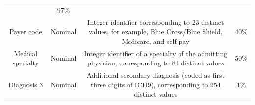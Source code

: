 \documentclass[]{article}
\begin{document}
\begin{longtable}[c]{@{}cccc@{}}
\begin{minipage}[t]{0.35\columnwidth}
\strut\end{minipage} &
\begin{minipage}[t]{0.24\columnwidth}\centering\strut
97\%
\strut\end{minipage}\tabularnewline
\begin{minipage}[t]{0.20\columnwidth}\centering\strut
Payer code
\strut\end{minipage} &
\begin{minipage}[t]{0.09\columnwidth}\centering\strut
Nominal
\strut\end{minipage} &
\begin{minipage}[t]{0.35\columnwidth}\centering\strut
Integer identifier corresponding to 23 distinct values, for example,
Blue Cross/Blue Shield, Medicare, and self-pay
\strut\end{minipage} &
\begin{minipage}[t]{0.24\columnwidth}\centering\strut
40\%
\strut\end{minipage}\tabularnewline
\begin{minipage}[t]{0.20\columnwidth}\centering\strut
Medical specialty
\strut\end{minipage} &
\begin{minipage}[t]{0.09\columnwidth}\centering\strut
Nominal
\strut\end{minipage} &
\begin{minipage}[t]{0.35\columnwidth}\centering\strut
Integer identifier of a specialty of the admitting physician,
corresponding to 84 distinct values
\strut\end{minipage} &
\begin{minipage}[t]{0.24\columnwidth}\centering\strut
50\%
\strut\end{minipage}\tabularnewline
\begin{minipage}[t]{0.20\columnwidth}\centering\strut
Diagnosis 3
\strut\end{minipage} &
\begin{minipage}[t]{0.09\columnwidth}\centering\strut
Nominal
\strut\end{minipage} &
\begin{minipage}[t]{0.35\columnwidth}\centering\strut
Additional secondary diagnosis (coded as first three digits of ICD9),
corresponding to 954 distinct values
\strut\end{minipage} &
\begin{minipage}[t]{0.24\columnwidth}\centering\strut
1\%
\strut\end{minipage}\tabularnewline
\bottomrule
\end{longtable}
\end{document}
